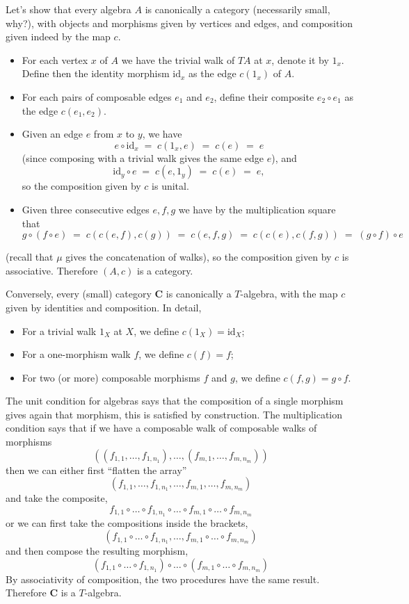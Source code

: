 \documentclass[12pt,oneside]{scrbook}
\numberwithin{equation}{section}
\theoremstyle{plain}
\theoremstyle{definition}
\newcommand{\cat}[1]{{\mathbf{#1}}} %
\DeclareMathOperator{\1}{\mathbbm{1}}
\DeclareMathOperator{\2}{\mathbbm{2}}
\newcommand{\id}{\mathrm{id}} %
\begin{document}
 Let's show that every algebra $A$ is canonically a category (necessarily small, why?), with objects and morphisms given by vertices and edges, and composition given indeed by the map $c$. 
 \begin{itemize}
  \item For each vertex $x$ of $A$ we have the trivial walk of $TA$ at $x$, denote it by $1_x$. Define then the identity morphism $\id_x$ as the edge $c(1_x)$ of $A$. 
  \item For each pairs of composable edges $e_1$ and $e_2$, define their composite $e_2\circ e_1$ as the edge $c(e_1,e_2)$. 
  \item Given an edge $e$ from $x$ to $y$, we have
  $$
  e \circ \id_x \;=\; c(1_x,e) \;=\; c(e) \;=\;e
  $$
  (since composing with a trivial walk gives the same edge $e$), and 
  $$
  \id_y\circ e \;=\; c(e,1_y) \;=\; c(e) \;=\; e ,
  $$
  so the composition given by $c$ is unital.
  \item Given three consecutive edges $e,f,g$ we have by the multiplication square that
  $$
  g\circ (f\circ e) \;=\; c(c(e,f),c(g)) \;=\; c(e,f,g) \;=\; c(c(e),c(f,g)) \;=\; (g\circ f)\circ e 
  $$
 \end{itemize}
 (recall that $\mu$ gives the concatenation of walks),
 so the composition given by $c$ is associative.
 Therefore $(A,c)$ is a category.

 Conversely, every (small) category $\cat{C}$ is canonically a $T$-algebra, with the map $c$ given by identities and composition. In detail,
 \begin{itemize}
  \item For a trivial walk $1_X$ at $X$, we define $c(1_X)=\id_X$;
  \item For a one-morphism walk $f$, we define $c(f)=f$;
  \item For two (or more) composable morphisms $f$ and $g$, we define $c(f,g)=g\circ f$. 
 \end{itemize}
 The unit condition for algebras says that the composition of a single morphism gives again that morphism, this is satisfied by construction. The multiplication condition says that if we have a composable walk of composable walks of morphisms 
 $$
 ((f_{1,1},\dots,f_{1,n_1}),\dots,(f_{m,1},\dots,f_{m,n_m}))
 $$
 then we can either first ``flatten the array'' 
 $$
 (f_{1,1},\dots,f_{1,n_1},\dots,f_{m,1},\dots,f_{m,n_m})
 $$
 and take the composite,
 $$
 f_{1,1}\circ\dots\circ f_{1,n_1}\circ\dots\circ f_{m,1}\circ\dots\circ f_{m,n_m}
 $$
 or we can first take the compositions inside the brackets,
 $$
 (f_{1,1}\circ\dots\circ f_{1,n_1},\dots,f_{m,1}\circ\dots\circ f_{m,n_m})
 $$
 and then compose the resulting morphism,
 $$
 (f_{1,1}\circ\dots\circ f_{1,n_1})\circ\dots\circ (f_{m,1}\circ\dots\circ f_{m,n_m})
 $$
 By associativity of composition, the two procedures have the same result. Therefore $\cat{C}$ is a $T$-algebra.
 
\end{document}
